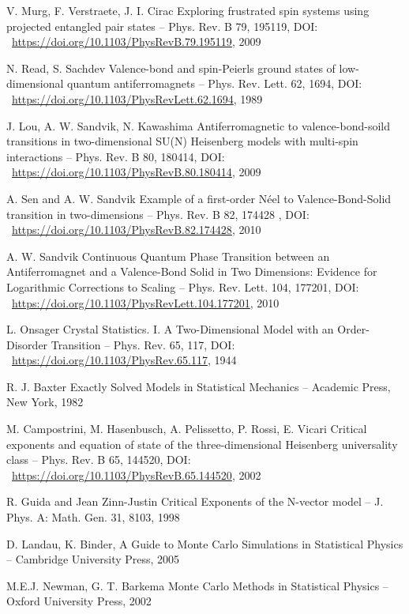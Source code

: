 \documentclass[11pt]{article}
\begin{document}
\begin{thebibliography}{3}
V. Murg, F. Verstraete, J. I. Cirac Exploring frustrated spin systems using projected entangled pair states -- Phys. Rev. B 79, 195119, DOI: ~\url{https://doi.org/10.1103/PhysRevB.79.195119}, 2009

N. Read, S. Sachdev Valence-bond and spin-Peierls ground states of low-dimensional quantum antiferromagnets -- Phys. Rev. Lett. 62, 1694, DOI: ~\url{https://doi.org/10.1103/PhysRevLett.62.1694}, 1989

J. Lou, A. W. Sandvik, N. Kawashima Antiferromagnetic to valence-bond-soild transitions in two-dimensional SU(N) Heisenberg models with multi-spin interactions -- Phys. Rev. B 80, 180414, DOI: ~\url{https://doi.org/10.1103/PhysRevB.80.180414}, 2009

A. Sen and A. W. Sandvik Example of a first-order Néel to Valence-Bond-Solid transition in two-dimensions -- Phys. Rev. B 82, 174428 , DOI: ~\url{https://doi.org/10.1103/PhysRevB.82.174428}, 2010

A. W. Sandvik Continuous Quantum Phase Transition between an Antiferromagnet and a Valence-Bond Solid in Two Dimensions: Evidence for Logarithmic Corrections to Scaling -- Phys. Rev. Lett. 104, 177201, DOI: ~\url{https://doi.org/10.1103/PhysRevLett.104.177201}, 2010

L. Onsager Crystal Statistics. I. A Two-Dimensional Model with an Order-Disorder Transition -- Phys. Rev. 65, 117, DOI: ~\url{https://doi.org/10.1103/PhysRev.65.117}, 1944

R. J. Baxter Exactly Solved Models in Statistical Mechanics -- Academic Press, New York, 1982

M. Campostrini, M. Hasenbusch, A. Pelissetto, P. Rossi, E. Vicari Critical exponents and equation of state of the three-dimensional Heisenberg universality class -- Phys. Rev. B 65, 144520, DOI: ~\url{https://doi.org/10.1103/PhysRevB.65.144520}, 2002

R. Guida and Jean Zinn-Justin Critical Exponents of the N-vector model -- J. Phys. A: Math. Gen. 31, 8103, 1998

D. Landau, K. Binder, A Guide to Monte Carlo Simulations in Statistical Physics -- Cambridge University Press, 2005

M.E.J. Newman, G. T. Barkema Monte Carlo Methods in Statistical Physics -- Oxford University Press, 2002


\end{thebibliography}
\end{document}
